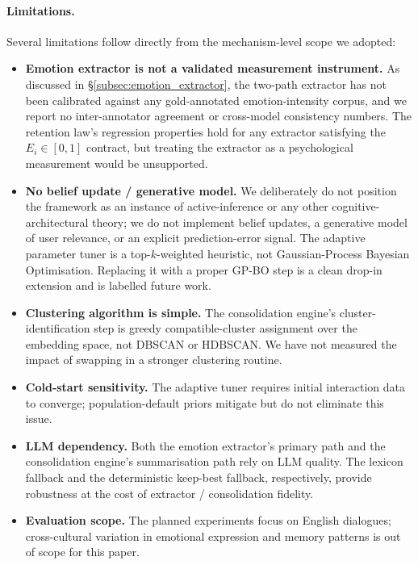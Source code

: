 \paragraph{Limitations.} Several limitations follow directly from the mechanism-level scope we adopted:
\begin{itemize}
    \item \textbf{Emotion extractor is not a validated measurement instrument.} As discussed in \S\ref{subsec:emotion_extractor}, the two-path extractor has not been calibrated against any gold-annotated emotion-intensity corpus, and we report no inter-annotator agreement or cross-model consistency numbers. The retention law's regression properties hold for any extractor satisfying the $E_i \in [0,1]$ contract, but treating the extractor as a psychological measurement would be unsupported.
    \item \textbf{No belief update / generative model.} We deliberately do not position the framework as an instance of active-inference or any other cognitive-architectural theory; we do not implement belief updates, a generative model of user relevance, or an explicit prediction-error signal. The adaptive parameter tuner is a top-$k$-weighted heuristic, not Gaussian-Process Bayesian Optimisation. Replacing it with a proper GP-BO step is a clean drop-in extension and is labelled future work.
    \item \textbf{Clustering algorithm is simple.} The consolidation engine's cluster-identification step is greedy compatible-cluster assignment over the embedding space, not DBSCAN or HDBSCAN. We have not measured the impact of swapping in a stronger clustering routine.
    \item \textbf{Cold-start sensitivity.} The adaptive tuner requires initial interaction data to converge; population-default priors mitigate but do not eliminate this issue.
    \item \textbf{LLM dependency.} Both the emotion extractor's primary path and the consolidation engine's summarisation path rely on LLM quality. The lexicon fallback and the deterministic keep-best fallback, respectively, provide robustness at the cost of extractor / consolidation fidelity.
    \item \textbf{Evaluation scope.} The planned experiments focus on English dialogues; cross-cultural variation in emotional expression and memory patterns is out of scope for this paper.
\end{itemize}

